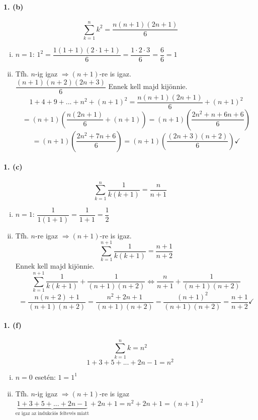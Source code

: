 \documentclass[12pt,a4paper,fleqn]{article}
\newcommand{\myparagraph}[1]{\paragraph{#1}\mbox{}}
\begin{document}
\myparagraph{1. (b)}
\[ \sum_{k=1}^{n} k^2 = \dfrac{n(n+1)(2n+1)}{6} \]
\begin{enumerate}[i.]
  \item $n=1$: $1^2 = \dfrac{1(1+1)(2 \cdot 1 + 1)}{6} = \dfrac{1 \cdot 2
    \cdot 3}{6} = \dfrac{6}{6} = 1$ \checkmark
  \item Tfh. $n$-ig igaz $\Rightarrow (n+1)$-re is igaz. \\[1.2em]
  $ \dfrac{(n+1)(n+2)(2n+3)}{6} $ Ennek kell majd kijönnie.
  \[ 1 + 4 + 9 + ... + n^2 + (n+1)^2 = \dfrac{n(n+1)(2n+1)}{6} + (n+1)^2 \]
  \[ = (n+1) \left( \dfrac{n(2n+1)}{6} + (n+1) \right) = (n+1)
    \left( \dfrac{2n^2+n+6n+6}{6} \right) \]
  \[
    = (n+1) \left( \dfrac{2n^2+7n+6}{6} \right)
    = (n+1) \left( \dfrac{(2n+3)(n+2)}{6} \right) \checkmark
  \]
\end{enumerate}


\myparagraph{1. (c)}
\[ \sum_{k=1}^{n} \dfrac{1}{k(k+1)} = \dfrac{n}{n+1} \]
\begin{enumerate}[i.]
  \item $n=1$: $\dfrac{1}{1(1+1)} = \dfrac{1}{1+1} = \dfrac{1}{2}$
  \item Tfh. $n$-re igaz $\Rightarrow (n+1)$-re is igaz.
  \[ \sum_{k=1}^{n+1} \dfrac{1}{k(k+1)} = \dfrac{n+1}{n+2} \]
  Ennek kell majd kijönnie.
  \[ \sum_{k=1}^{n+1} \dfrac{1}{k(k+1)} + \dfrac{1}{(n+1)(n+2)} \iff \dfrac{n}{n+1}
    + \dfrac{1}{(n+1)(n+2)}
  \]
  \[ = \dfrac{n(n+2)+1}{(n+1)(n+2)} = \dfrac{n^2+2n+1}{(n+1)(n+2)}
    = \dfrac{(n+1)^2}{(n+1)(n+2)} = \dfrac{n+1}{n+2} \checkmark \]

\end{enumerate}

\myparagraph{1. (f)}
\[ \sum_{k=1}^{n} k = n^2 \]
\[ 1+3+5+...+2n-1 = n^2 \]
\begin{enumerate}[i.]
  \item $n=0$ esetén: $1=1^1$ \checkmark
  \item Tfh. $n$-ig igaz $\Rightarrow (n+1)$-re is igaz \\
    $\underbrace{1+3+5+...+2n-1}_{\text{ez igaz az indukciós feltevés miatt}}
    + 2n+1 = n^2 + 2n + 1 = (n+1)^2$ \checkmark
\end{enumerate}
\end{document}
